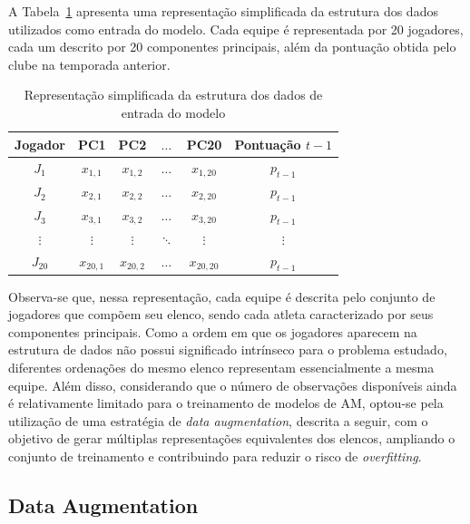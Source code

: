 A Tabela~\ref{tab:estrutura_dados} apresenta uma representação simplificada da estrutura
dos dados utilizados como entrada do modelo. Cada equipe é representada por 20 jogadores,
cada um descrito por 20 componentes principais, além da pontuação obtida pelo clube na
temporada anterior.

\begin{table}[hbt]
\centering
\caption{Representação simplificada da estrutura dos dados de entrada do modelo}
\label{tab:estrutura_dados}

\begin{tabular}{cccccc}
\hline
Jogador & PC1 & PC2 & $\dots$ & PC20 & Pontuação $t-1$ \\
\hline
$J_1$  & $x_{1,1}$ & $x_{1,2}$ & $\dots$ & $x_{1,20}$ & $p_{t-1}$ \\
$J_2$  & $x_{2,1}$ & $x_{2,2}$ & $\dots$ & $x_{2,20}$ & $p_{t-1}$ \\
$J_3$  & $x_{3,1}$ & $x_{3,2}$ & $\dots$ & $x_{3,20}$ & $p_{t-1}$ \\
$\vdots$ & $\vdots$ & $\vdots$ & $\ddots$ & $\vdots$ & $\vdots$ \\
$J_{20}$ & $x_{20,1}$ & $x_{20,2}$ & $\dots$ & $x_{20,20}$ & $p_{t-1}$ \\
\hline
\end{tabular}

\vspace{.3cm}
\end{table}

Observa-se que, nessa representação, cada equipe é descrita pelo conjunto de jogadores que
compõem seu elenco, sendo cada atleta caracterizado por seus componentes principais. Como
a ordem em que os jogadores aparecem na estrutura de dados não possui significado intrínseco
para o problema estudado, diferentes ordenações do mesmo elenco representam essencialmente
a mesma equipe. Além disso, considerando que o número de observações disponíveis ainda é
relativamente limitado para o treinamento de modelos de AM, optou-se pela utilização de uma
estratégia de \textit{data augmentation}, descrita a seguir, com o objetivo de gerar múltiplas
representações equivalentes dos elencos, ampliando o conjunto de treinamento e contribuindo
para reduzir o risco de \textit{overfitting}.

\subsection{Data Augmentation}

